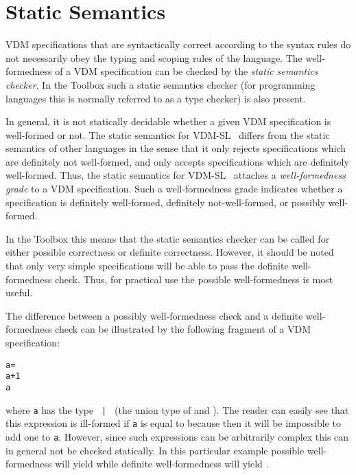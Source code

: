 \documentclass[\pformat,12pt]{article}
\newcommand{\vdmslpp}[2]{%
#1
}
\newcommand{\vdmsl}{VDM-SL}
\newcommand{\vdmpp}{VDM++}
\begin{document}
\section{Static Semantics}\label{static}

VDM specifications that are syntactically correct according to the
syntax rules do not necessarily obey the
typing and scoping rules of the language.
The well-formedness of a
VDM specification can be checked by the {\em static semantics checker}.
In the Toolbox such a static semantics checker (for programming
languages this is normally referred to as a type checker) is also
present.

In general, it is not statically decidable whether a given VDM
specification is well-formed or not.  The static semantics for
\vdmslpp{\vdmsl}{\vdmpp}\ differs from the static semantics of other
languages in the sense that it only rejects specifications which are
definitely not well-formed, and only accepts specifications which are
definitely well-formed.  Thus, the static semantics for
\vdmslpp{\vdmsl}{\vdmpp}\ attaches a {\em well-formedness grade} to a
VDM specification.  Such a well-formedness grade indicates whether a
specification is definitely well-formed, definitely not-well-formed, or
possibly well-formed.

In the Toolbox this means that the static semantics checker can be
called for either possible correctness or definite correctness.
However, it should be noted that only very simple specifications will
be able to pass the definite well-formed\-ness check. Thus, for
practical use the possible well-formedness is most useful.

The difference between a possibly well-formedness check and a definite
well-formedness check can be illustrated by the following
fragment of a VDM specification:
\begin{alltt}
    a =  
    a + 1 
     a
\end{alltt}
where {\tt a} has the type {\tt {} | } (the union
type of
 and
). The reader can easily see that this expression is
ill-formed if {\tt a} is equal to  because then it will be
impossible to add one to {\tt a}. However, since such expressions can
be arbitrarily complex this can in general not be checked statically. In
this particular example possible well-formedness will yield
 while definite well-formedness will yield .
\end{document}

